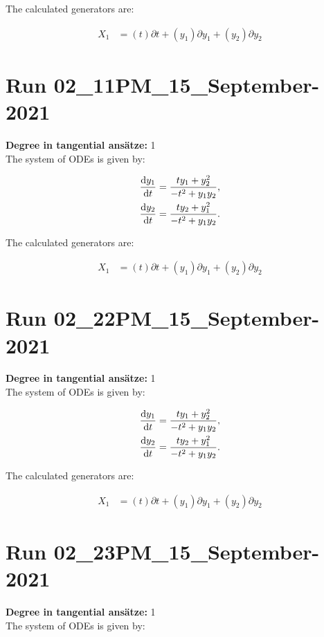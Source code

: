 \noindent The calculated generators are:

\begin{align*}
X_{1}&=\left( t \right)\partial t+\left( y_{1} \right)\partial y_{1}+\left( y_{2} \right)\partial y_{2}\end{align*}
\section*{Run 02\_11PM\_15\_September-2021}
\textbf{Degree in tangential ansätze:}	1\\
The system of ODEs is given by:

\begin{align*}
\dv{y_{1}}{t}&=\frac{t y_{1} + y_{2}^{2}}{- t^{2} + y_{1} y_{2}},\\
\dv{y_{2}}{t}&=\frac{t y_{2} + y_{1}^{2}}{- t^{2} + y_{1} y_{2}}.\\
\end{align*}

\noindent The calculated generators are:

\begin{align*}
X_{1}&=\left( t \right)\partial t+\left( y_{1} \right)\partial y_{1}+\left( y_{2} \right)\partial y_{2}\end{align*}
\section*{Run 02\_22PM\_15\_September-2021}
\textbf{Degree in tangential ansätze:}	1\\
The system of ODEs is given by:

\begin{align*}
\dv{y_{1}}{t}&=\frac{t y_{1} + y_{2}^{2}}{- t^{2} + y_{1} y_{2}},\\
\dv{y_{2}}{t}&=\frac{t y_{2} + y_{1}^{2}}{- t^{2} + y_{1} y_{2}}.\\
\end{align*}

\noindent The calculated generators are:

\begin{align*}
X_{1}&=\left( t \right)\partial t+\left( y_{1} \right)\partial y_{1}+\left( y_{2} \right)\partial y_{2}\end{align*}
\section*{Run 02\_23PM\_15\_September-2021}
\textbf{Degree in tangential ansätze:}	1\\
The system of ODEs is given by:

